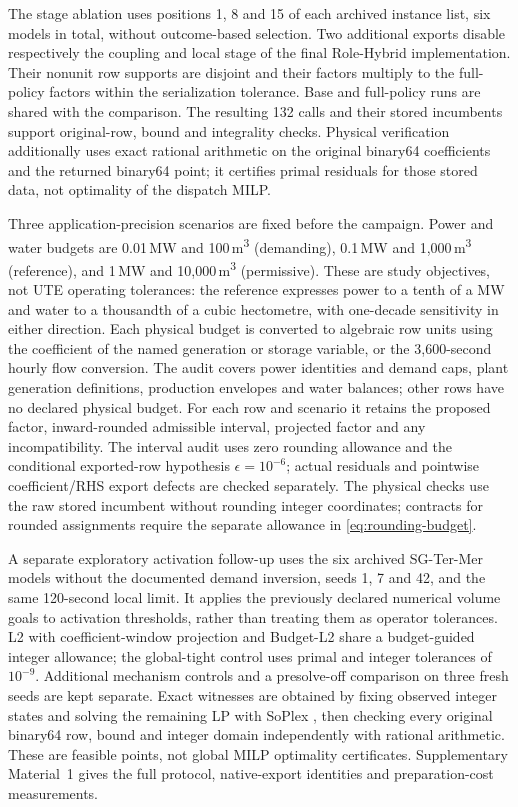 The stage ablation uses positions 1, 8 and 15 of each archived instance list, six models
in total, without outcome-based selection. Two additional exports disable respectively
the coupling and local stage of the final Role-Hybrid implementation. Their nonunit row
supports are disjoint and their factors multiply to the full-policy factors within the
serialization tolerance. Base and full-policy runs are shared with the comparison.
The resulting 132 calls and their stored incumbents support original-row, bound and
integrality checks. Physical verification additionally uses exact rational arithmetic
on the original binary64 coefficients and the returned binary64 point; it certifies
primal residuals for those stored data, not optimality of the dispatch MILP.

Three application-precision scenarios are fixed before the campaign. Power and water
budgets are 0.01\,MW and 100\,m\textsuperscript{3} (demanding),
0.1\,MW and 1{,}000\,m\textsuperscript{3} (reference), and
1\,MW and 10{,}000\,m\textsuperscript{3} (permissive). These are study objectives, not UTE
operating tolerances: the reference expresses power to a tenth of a MW and water to
a thousandth of a cubic hectometre, with one-decade sensitivity in either direction.
Each physical budget is converted to algebraic row units using the coefficient of
the named generation or storage variable, or the 3,600-second hourly flow conversion.
The audit covers power identities and demand caps, plant generation definitions,
production envelopes and water balances; other rows have no declared physical budget.
For each row and scenario it retains the proposed factor, inward-rounded admissible
interval, projected factor and any incompatibility. The interval audit uses zero
rounding allowance and the conditional exported-row hypothesis $\epsilon=10^{-6}$;
actual residuals and pointwise coefficient/RHS export defects are checked separately.
The physical checks use the raw stored incumbent without rounding integer coordinates;
contracts for rounded assignments require the separate allowance in
\eqref{eq:rounding-budget}.

A separate exploratory activation follow-up uses the six archived SG-Ter-Mer models
without the documented demand inversion, seeds 1, 7 and 42, and the same 120-second
local limit. It applies the previously declared numerical volume goals to activation
thresholds, rather than treating them as operator tolerances. L2 with coefficient-window
projection and Budget-L2 share a budget-guided integer allowance; the global-tight control
uses primal and integer tolerances of $10^{-9}$. Additional mechanism controls and a
presolve-off comparison on three fresh seeds are kept separate. Exact witnesses are
obtained by fixing observed integer states and solving the remaining LP with SoPlex
\cite{gleixner2016refinement,gleixner2020oracles}, then checking every original binary64
row, bound and integer domain independently with rational arithmetic. These are feasible
points, not global MILP optimality certificates. Supplementary Material~1 gives the full
protocol, native-export identities and preparation-cost measurements.
